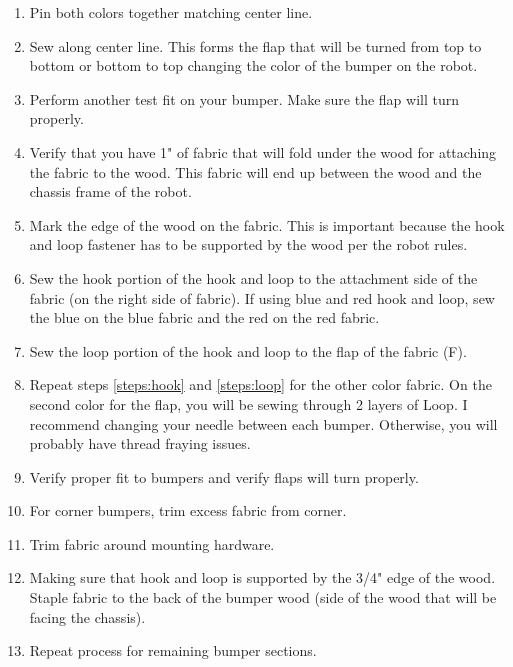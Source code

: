 \documentclass[
10pt, %
a4paper, %
oneside, %
headinclude,footinclude, %
BCOR5mm, %
]{scrartcl}
\begin{document}
\begin{enumerate}
	\item Pin both colors together matching center line.
	\item Sew along center line. This forms the flap that will be turned from top to bottom or bottom to top changing the color of the bumper on the robot.
	\item Perform another test fit on your bumper. Make sure the flap will turn properly.
	\item Verify that you have 1" of fabric that will fold under the wood for attaching the fabric to the wood. This fabric will end up between the wood and the chassis frame of the robot.
	\item Mark the edge of the wood on the fabric. This is important because the hook and loop fastener has to be supported by the wood per the robot rules.
	\item Sew the hook portion of the hook and loop to the attachment side of the fabric (on the right side of fabric). \label{steps:hook}
	\subitem If using blue and red hook and loop, sew the blue on the blue fabric and the red on the red fabric.
	\item Sew the loop portion of the hook and loop to the flap of the fabric (F). \label{steps:loop}
	\item Repeat steps \ref{steps:hook} and \ref{steps:loop} for the other color fabric. On the second color for the flap, you will be sewing through 2 layers  of Loop.
	\subitem I recommend changing your needle between each bumper. Otherwise, you will probably have thread fraying issues.
	\item Verify proper fit to bumpers and verify flaps will turn properly.
	\item For corner bumpers, trim excess fabric from corner.
	\item Trim fabric around mounting hardware.
	\item Making sure that hook and loop is supported by the 3/4" edge of the wood. Staple fabric to the back of the bumper wood (side of the wood that will be facing the chassis).
	\item Repeat process for remaining bumper sections.
\end{enumerate}


\end{document}
